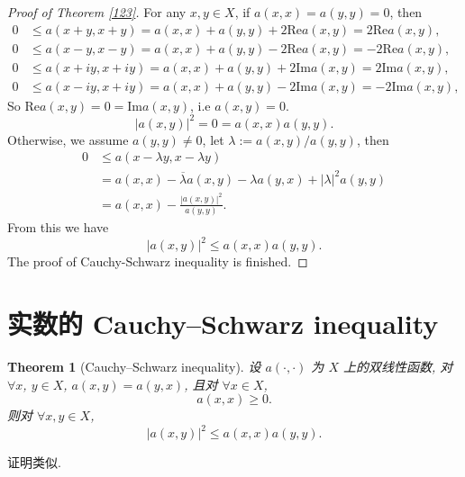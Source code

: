 \documentclass[a4paper,12pt]{article}
\newtheorem{theorem}{Theorem}[section]
\theoremstyle{definition}
\begin{document}
\begin{proof}[Proof of Theorem \ref{123}]
    For any $  x, y \in X $, if $ a(x, x) = a(y, y) = 0 $, then
    \begin{align*}
        0 &\leq a(x + y, x + y) = a(x, x) + a(y, y) + 2 \text{Re} a(x, y) = 2 \text{Re} a(x, y), \\
        0 &\leq a(x - y, x - y) = a(x, x) + a(y, y) - 2 \text{Re} a(x, y) = - 2 \text{Re} a(x, y), \\
        0 &\leq a(x + iy, x + iy) = a(x, x) + a(y, y) + 2 \text{Im} a(x, y) = 2 \text{Im} a(x, y), \\
        0 &\leq a(x - iy, x + iy) = a(x, x) + a(y, y) - 2 \text{Im} a(x, y) = - 2 \text{Im} a(x, y),
    \end{align*}
    So $ \text{Re} a(x, y) = 0 = \text{Im} a(x, y) $, i.e $ a(x, y) = 0 $. 
    $$ 
        |a(x, y)|^2 = 0 = a(x, x) a(y, y).
    $$
    Otherwise, we assume $ a(y, y) \neq 0 $, let $ \lambda := a(x, y) / a(y, y) $, then
    \begin{align*}
        0 &\leq a(x - \lambda y, x - \lambda y)\\
          &= a(x, x) - \overline{\lambda} a(x, y) - \lambda a(y, x) + |\lambda|^2 a(y, y) \\
          &= a(x, x) - \frac{|a(x, y)|^2}{a(y, y)}.
    \end{align*}
    From this we have
    $$ 
        |a(x, y)|^2 \leq a(x, x) a(y, y).
    $$
    The proof of Cauchy-Schwarz inequality is finished.
\end{proof}

\section{实数的 Cauchy–Schwarz inequality}

\begin{theorem}[Cauchy–Schwarz inequality]
    设 $ a(\cdot, \cdot) $ 为 $ X $ 上的双线性函数, 对 $ \forall x $, $ y \in X $,
    $ a(x, y) = a(y, x) $, 且对 $ \forall x \in X $,
    $$
        a(x, x) \geq 0.
    $$
    则对 $ \forall x, y \in X $,
    $$
        |a(x, y)|^2 \leq a(x, x) a(y, y).
    $$
\end{theorem}

证明类似.
\end{document}
